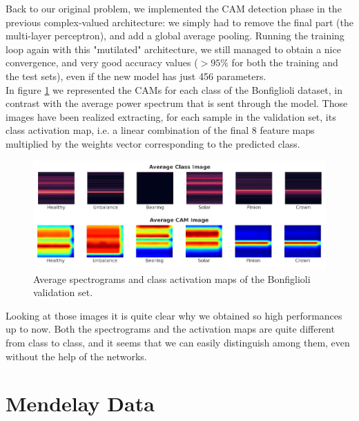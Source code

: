 \documentclass[../main.tex]{subfiles}
\begin{document}
Back to our original problem, we implemented the CAM detection phase in the previous complex-valued architecture: we simply had to remove the final part (the multi-layer perceptron), and add a global average pooling. Running the training loop again with this "mutilated" architecture, we still managed to obtain a nice convergence, and very good accuracy values ($>95\%$ for both the training and the test sets), even if the new model has just 456 parameters.\\
In figure \ref{fig:bonfiglioli_CAM_images} we represented the CAMs for each class of the Bonfiglioli dataset, in contrast with the average power spectrum that is sent through the model. Those images have been realized extracting, for each sample in the validation set, its class activation map, i.e. a linear combination of the final 8 feature maps multiplied by the weights vector corresponding to the predicted class. 
\begin{figure}[ht]
	\centering
	\includegraphics[width=\textwidth]{pictures/bonfiglioli_CAM_images}
	\caption{Average spectrograms and class activation maps of the Bonfiglioli validation set.}
	\label{fig:bonfiglioli_CAM_images}	
\end{figure}

Looking at those images it is quite clear why we obtained so high performances up to now. Both the spectrograms and the activation maps are quite different from class to class, and it seems that we can easily distinguish among them, even without the help of the networks.

\section{Mendelay Data}
\end{document}
